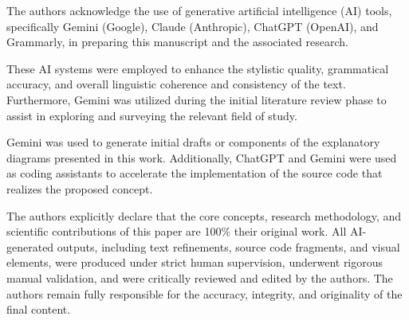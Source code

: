 \documentclass[conference]{IEEEtran}
\begin{document}
The authors acknowledge the use of generative artificial intelligence (AI) tools, specifically Gemini (Google), Claude (Anthropic), ChatGPT (OpenAI), and Grammarly, in preparing this manuscript and the associated research.

These AI systems were employed to enhance the stylistic quality, grammatical accuracy, and overall linguistic coherence and consistency of the text. Furthermore, Gemini was utilized during the initial literature review phase to assist in exploring and surveying the relevant field of study.

Gemini was used to generate initial drafts or components of the explanatory diagrams presented in this work. Additionally, ChatGPT and Gemini were used as coding assistants to accelerate the implementation of the source code that realizes the proposed concept.

The authors explicitly declare that the core concepts, research methodology, and scientific contributions of this paper are 100\% their original work. All AI-generated outputs, including text refinements, source code fragments, and visual elements, were produced under strict human supervision, underwent rigorous manual validation, and were critically reviewed and edited by the authors. The authors remain fully responsible for the accuracy, integrity, and originality of the final content.



\end{document}
